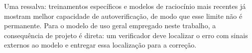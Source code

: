 Uma ressalva: treinamentos específicos e modelos de raciocínio mais recentes já mostram melhor capacidade de autoverificação, de modo que esse limite não é permanente. Para o modelo de uso geral empregado neste trabalho, a consequência de projeto é direta: um verificador deve localizar o erro com sinais externos ao modelo e entregar essa localização para a correção.
